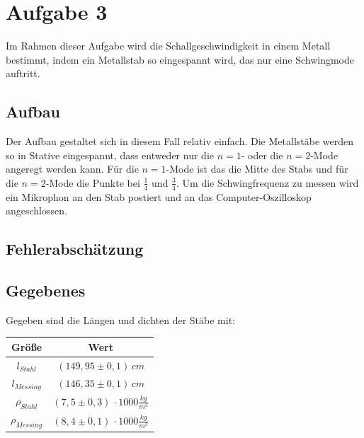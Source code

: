 \newpage
\section{Aufgabe 3}
Im Rahmen dieser Aufgabe wird die Schallgeschwindigkeit in einem Metall bestimmt, indem ein Metallstab so eingespannt wird, das nur eine Schwingmode auftritt.
\subsection{Aufbau}
Der Aufbau gestaltet sich in diesem Fall relativ einfach. Die Metallstäbe werden so in Stative eingespannt, dass entweder nur die \(n=1\)- oder die \(n=2\)-Mode angeregt werden kann. Für die \(n=1\)-Mode ist das die Mitte des Stabs und für die \(n=2\)-Mode die Punkte bei \(\frac{1}{4}\) und \(\frac{3}{4}\). Um die Schwingfrequenz zu messen wird ein Mikrophon an den Stab postiert und an das Computer-Oszilloskop angeschlossen.
\subsection{Fehlerabschätzung}
\subsection{Gegebenes}
Gegeben sind die Längen und dichten der Stäbe mit:
\begin{center}
\begin{tabular}{c|c}
Größe & Wert\\\hline
\(l_{Stahl}\) & \((149,95 \pm 0,1)\,cm\) \\
\(l_{Messing}\) & \((146,35 \pm 0,1)\,cm\) \\
\(\rho_{Stahl}\) & \((7,5 \pm 0,3)\,\cdot 1000\frac{kg}{m^3}\) \\
\(\rho_{Messing}\) & \((8,4 \pm 0,1)\,\cdot 1000\frac{kg}{m^3}\)
\end{tabular}
\end{center}
